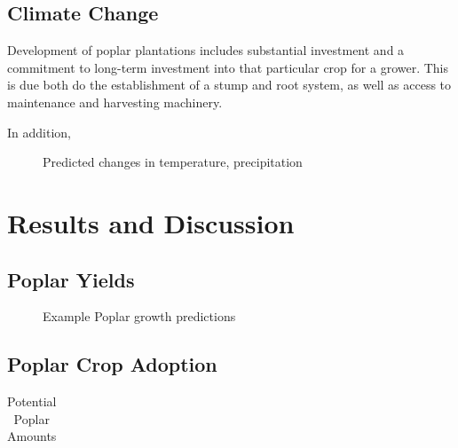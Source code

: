 \documentclass[preprint,12pt]{elsarticle}
\begin{document}

\subsection{Climate Change}
\label{sec:climate}

Development of poplar plantations includes substantial investment and
a commitment to long-term investment into that particular crop for a
grower.  This is due both do the establishment of a stump and root
system, as well as access to maintenance and harvesting machinery. 

In addition, 

\begin{figure}[hp]
  \centering
  
  \caption{Predicted changes in temperature, precipitation }
  \label{fig:temp}
\end{figure}

\section{Results and Discussion}

\subsection{Poplar Yields}
\label{sec:yield}

\begin{figure}[hp]
  \centering
  
  \caption{Example Poplar growth predictions}
  \label{fig:examples}
\end{figure}



\subsection{Poplar Crop Adoption}
\label{sec:bcam-out}

\begin{table}[hp]
  \centering
  \begin{tabular}{|l|c|c|}
    
  \end{tabular}
  \caption{Potential Poplar Amounts}
  \label{tab:potential}
\end{table}
\end{document}
